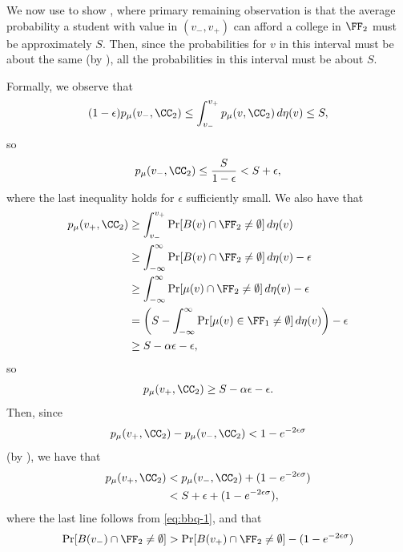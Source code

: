 \documentclass[10pt]{article}
\begin{document}
\begin{ReviewVerbatim}
We now use  to show , where primary remaining observation is that the average probability a student with value in $(v_-,v_+)$ can afford a college in $\FF_2$ must be approximately $S.$ Then, since the probabilities for $v$ in this interval must be about the same (by ), all the probabilities in this interval must be about $S$.

Formally, we observe that
\begin{align}
    (1 - \epsilon) p_\mu(v_-, \CC_2) \le \int_{v_-}^{v_+} p_\mu(v, \CC_2)\,d\eta(v) \le S,
\end{align}
so
\begin{equation}\label{eq:bbq-1}
    p_\mu(v_-, \CC_2) \le \frac{S}{1-\epsilon} < S + \epsilon,
\end{equation}
where the last inequality holds for $\epsilon$ sufficiently small. We also have that
\begin{align}
    p_\mu(v_+, \CC_2) &\ge \int_{v_-}^{v_+} \Pr[B(v)\cap \FF_2\neq \emptyset]\,d\eta(v)\\
    &\ge \int_{-\infty}^\infty \Pr[B(v)\cap \FF_2\neq \emptyset]\,d\eta(v) - \epsilon \\
    &\ge \int_{-\infty}^\infty \Pr[\mu(v)\cap \FF_2\neq \emptyset]\,d\eta(v) - \epsilon \label{eq:ginger}\\
    &= \left(S - \int_{-\infty}^\infty \Pr[\mu(v)\in \FF_1\neq \emptyset]\,d\eta(v)\right) - \epsilon\\
    &\ge S - \alpha\epsilon - \epsilon,
\end{align}
so
\begin{equation}\label{eq:bbq-2}
    p_\mu(v_+, \CC_2) \ge S - \alpha\epsilon - \epsilon.
\end{equation}
Then, since
\begin{equation}
    p_\mu(v_+, \CC_2) - p_\mu(v_-, \CC_2) < 1 - e^{-2\epsilon\sigma}
\end{equation}
(by ), we have that
\begin{align}
    p_\mu(v_+, \CC_2) &< p_\mu(v_-, \CC_2) + (1 - e^{-2\epsilon\sigma})\\
    &< S + \epsilon + (1 - e^{-2\epsilon\sigma})\label{eq:cucumber-1},
\end{align}
where the last line follows from \eqref{eq:bbq-1}, and that
\begin{align}
    \Pr[B(v_-)\cap \FF_2\neq \emptyset] &> \Pr[B(v_+)\cap \FF_2\neq \emptyset] - (1 - e^{-2\epsilon\sigma})\\

\end{align}
\end{ReviewVerbatim}
\end{document}
